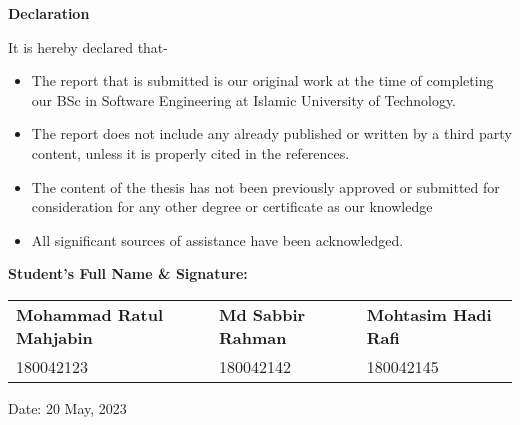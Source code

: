 \begin{center}
\Large \textbf{Declaration}
\end{center}
\normalsize
It is hereby declared that-
\begin{itemize}
    \item The report that is submitted is our original work at the time of completing our BSc in Software Engineering at Islamic University of Technology.
    \item The report does not include any already published or written by a third party content, unless it is properly cited in the references. 
    \item The content of the thesis has not been previously approved or submitted for consideration for any other degree or certificate as our knowledge
    \item All significant sources of assistance have been acknowledged. 
\end{itemize}
\textbf{Student’s Full Name \& Signature:}

\vspace{1cm}

\begin{center}
\noindent \begin{tabular}{@{}lll@{}}
    \textbf{Mohammad Ratul Mahjabin} & \textbf{Md Sabbir Rahman} & \textbf{Mohtasim Hadi Rafi} \\
    180042123 & 180042142 & 180042145\\
\end{tabular}
\end{center}
\vspace{1cm}

\noindent Date: 20 May, 2023